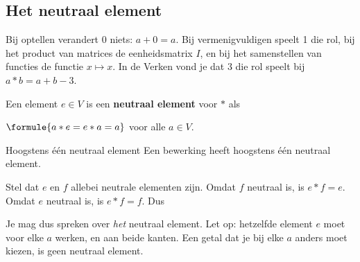 \subsection{Het neutraal element}

Bij optellen verandert 0 niets: $a + 0 = a$. Bij vermenigvuldigen speelt 1 die rol, bij het product van matrices de eenheidsmatrix $I$, en bij het samenstellen van functies de functie $x \mapsto x$. In de Verken vond je dat 3 die rol speelt bij $a \ast b = a + b - 3$.

\begin{theorie}
Een element $e \in V$ is een \textbf{\textcolor{accent}{neutraal element}} voor $\ast$ als

\vspace{1mm}
\qquad $\formule{a \ast e = e \ast a = a}$ \qquad voor alle $a \in V$.

\begin{stelling}{Hoogstens één neutraal element}
Een bewerking heeft hoogstens één neutraal element.
\end{stelling}

\begin{bewijs}
Stel dat $e$ en $f$ allebei neutrale elementen zijn. Omdat $f$ neutraal is, is $e \ast f = e$. Omdat $e$ neutraal is, is $e \ast f = f$. Dus
\end{bewijs}
\end{theorie}

Je mag dus spreken over \textit{het} neutraal element. Let op: hetzelfde element $e$ moet voor elke $a$ werken, en aan beide kanten. Een getal dat je bij elke $a$ anders moet kiezen, is geen neutraal element.



